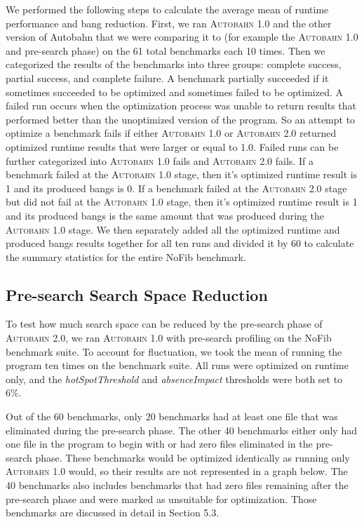 \documentclass[format=sigplan, review=true]{acmart}
\newcommand{\hotspotcost}[0]{\textit{hotSpotThreshold}}
\newcommand{\Ao}[0]{\textsc{Autobahn 1.0}}
\newcommand{\At}[0]{\textsc{Autobahn 2.0}}
\newcommand{\preopt}[0]{pre-search}
\newcommand{\Preopt}[0]{Pre-search}
\newcommand{\absim}[0]{\textit{absenceImpact}}
\begin{document}
We performed the following steps to calculate the average mean of runtime performance and bang reduction. First, we ran \Ao{} and the other version of Autobahn that we were comparing it to (for example the \Ao{} and \preopt{} phase) on the 61 total benchmarks each 10 times. Then we categorized the results of the benchmarks into three groups: complete success, partial success, and complete failure. A benchmark partially succeeded if it sometimes succeeded to be optimized and sometimes failed to be optimized. A failed run occurs when the optimization process was unable to return results that performed better than the unoptimized version of the program. So an attempt to optimize a benchmark fails if either \Ao{} or \At{} returned optimized runtime results that were larger or equal to 1.0.  Failed runs can be further categorized into \Ao{} fails and \At{} fails. If a benchmark failed at the \Ao{} stage, then it's optimized runtime result is 1 and its produced bangs is 0. If a benchmark failed at the \At{} stage but did not fail at the \Ao{} stage, then it's optimized runtime result is 1 and its produced bangs is the same amount that was produced during the \Ao{} stage. We then separately added all the optimized runtime and produced bangs results together for all ten runs and divided it by 60 to calculate the summary statistics for the entire NoFib benchmark. 

\subsection{\Preopt{} Search Space Reduction}
To test how much search space can be reduced by the \preopt{} phase of \At{}, we ran \Ao{} with \preopt{} profiling on the NoFib benchmark suite. To account for fluctuation, we took the mean of running the program ten times on the benchmark suite. All runs were optimized on runtime only, and the \hotspotcost{} and \absim{} thresholds were both set to 6\%. 

Out of the 60 benchmarks, only 20 benchmarks had at least one file that was eliminated during the \preopt{} phase. The other 40 benchmarks either only had one file in the program to begin with or had zero files eliminated in the \preopt{} phase. These benchmarks would be optimized identically as running only \Ao{} would, so their results are not represented in a graph below. The 40 benchmarks also includes benchmarks that had zero files remaining after the \preopt{} phase and were marked as unsuitable for optimization. Those benchmarks are discussed in detail in Section 5.3.
\end{document}
